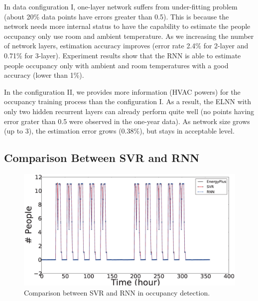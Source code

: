 In data configuration I, one-layer network suffers from under-fitting
problem (about 20\% data points have errors greater than 0.5). This is
because the network needs more internal status to have the capability
to estimate the people occupancy only use room and ambient
temperature.  As we increasing the number of network layers,
estimation accuracy improves (error rate 2.4\% for 2-layer and 0.71\%
for 3-layer). Experiment results show that the RNN is able to estimate
people occupancy only with ambient and room temperatures with a good
accuracy (lower than 1\%).

In the configuration II, we provides more information (HVAC powers)
for the occupancy training process than the configuration I. As a
result, the ELNN with only two hidden recurrent layers can
already perform quite well (no points having error grater than 0.5
were observed in the one-year data). As network size grows (up to 3),
the estimation error grows (0.38\%), but stays in acceptable level.

\subsection{Comparison Between SVR and RNN}
\label{sec:comparison_svr_rnn}

\begin{figure}[!h]
\centering
\includegraphics[width=5in]{./Pics/comparison.eps}
\caption{Comparison between SVR and RNN in occupancy detection.}
\label{fig:comparison}
\end{figure}

